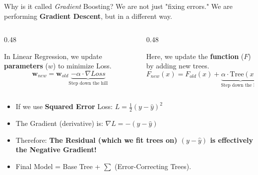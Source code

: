 \begin{frame}{Why is it called \textit{Gradient} Boosting?}
    We are not just "fixing errors." We are performing \textbf{Gradient Descent}, but in a different way.

    \vspace{-1.0em}
    \begin{columns}[T]
        \begin{column}{0.48\textwidth}
            \begin{tcolorbox}[colback=gray!10, title=\textbf{1. Gradient Descent}]
                \small
                In Linear Regression, we update \textbf{parameters} ($w$) to minimize Loss.
                \vspace{-2mm}
                $$ \mathbf{w}_{new} = \mathbf{w}_{old} \underbrace{- \alpha \cdot \nabla Loss}_{\text{Step down the hill}} $$
            \end{tcolorbox}
        \end{column}

        \begin{column}{0.48\textwidth}
            \begin{tcolorbox}[colback=blue!5, colframe=blue!60, title=\textbf{2. Gradient Boosting}]
                \small
                Here, we update the \textbf{function} ($F$) by adding new trees.
                \vspace{-1mm}
                $$ F_{new}(x) = F_{old}(x) + \underbrace{\alpha \cdot \text{Tree}(x)}_{\text{Step down the hill}} $$
            \end{tcolorbox}
        \end{column}
    \end{columns}

    \begin{itemize}
        \item If we use \textbf{Squared Error} Loss: $L = \frac{1}{2}(y - \hat{y})^2$
        \item The Gradient (derivative) is: $\nabla L = -(y - \hat{y})$
        \item Therefore: \textbf{The Residual (which we fit trees on) $(y - \hat{y})$ is effectively the Negative Gradient!}
        \item Final Model = Base Tree + $\sum$ (Error-Correcting Trees). 
    \end{itemize}
\end{frame}


